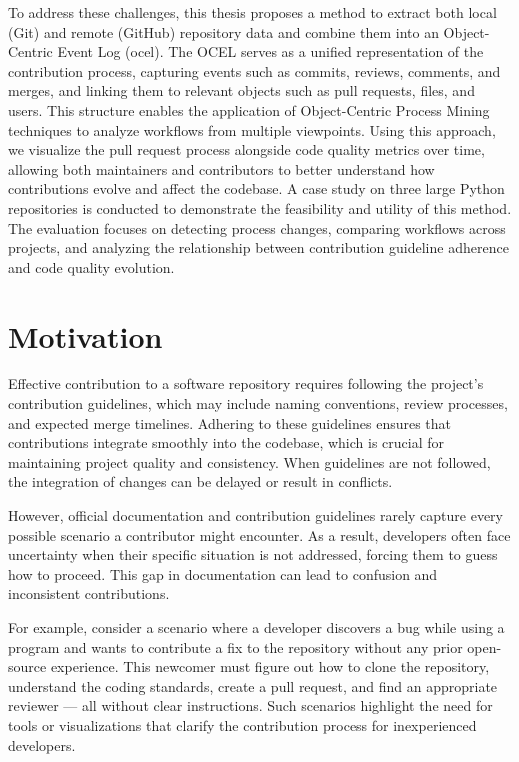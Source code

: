 To address these challenges, this thesis proposes a method to extract both local (Git) and remote (GitHub) repository data and combine them into an Object-Centric Event Log (\ac{ocel}). The OCEL serves as a unified representation of the contribution process, capturing events such as commits, reviews, comments, and merges, and linking them to relevant objects such as pull requests, files, and users. This structure enables the application of Object-Centric Process Mining techniques to analyze workflows from multiple viewpoints. Using this approach, we visualize the pull request process alongside code quality metrics over time, allowing both maintainers and contributors to better understand how contributions evolve and affect the codebase. A case study on three large Python repositories is conducted to demonstrate the feasibility and utility of this method. The evaluation focuses on detecting process changes, comparing workflows across projects, and analyzing the relationship between contribution guideline adherence and code quality evolution.

\section{Motivation}
Effective contribution to a software repository requires following the project’s contribution guidelines, which may include naming conventions, review processes, and expected merge timelines. Adhering to these guidelines ensures that contributions integrate smoothly into the codebase, which is crucial for maintaining project quality and consistency. When guidelines are not followed, the integration of changes can be delayed or result in conflicts.

However, official documentation and contribution guidelines rarely capture every possible scenario a contributor might encounter. As a result, developers often face uncertainty when their specific situation is not addressed, forcing them to guess how to proceed. This gap in documentation can lead to confusion and inconsistent contributions.

For example, consider a scenario where a developer discovers a bug while using a program and wants to contribute a fix to the repository without any prior open-source experience. This newcomer must figure out how to clone the repository, understand the coding standards, create a pull request, and find an appropriate reviewer — all without clear instructions. Such scenarios highlight the need for tools or visualizations that clarify the contribution process for inexperienced developers.


